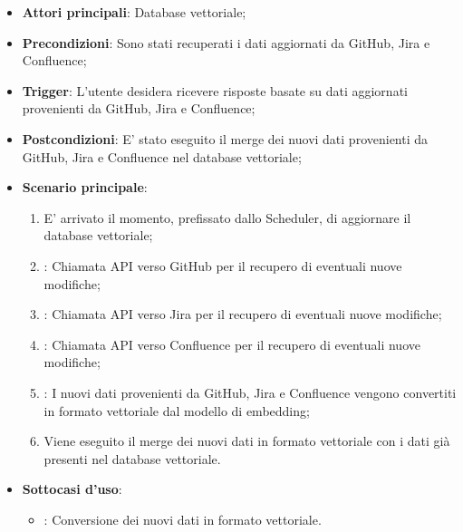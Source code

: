 \hypertarget{UC11.4}{}
\begin{itemize}
    \item \textbf{Attori principali}: Database vettoriale;
    \item \textbf{Precondizioni}: Sono stati recuperati i dati aggiornati da GitHub, Jira e Confluence;
    \item \textbf{Trigger}: L'utente desidera ricevere risposte basate su dati aggiornati provenienti da GitHub, Jira e Confluence;
    \item \textbf{Postcondizioni}: E' stato eseguito il merge dei nuovi dati provenienti da GitHub, Jira e Confluence nel database vettoriale;
    \item \textbf{Scenario principale}:
    \begin{enumerate}
        \item E' arrivato il momento, prefissato dallo Scheduler, di aggiornare il database vettoriale;
        \item {}: Chiamata API verso GitHub per il recupero di eventuali nuove modifiche;
        \item {}: Chiamata API verso Jira per il recupero di eventuali nuove modifiche;
        \item {}: Chiamata API verso Confluence per il recupero di eventuali nuove modifiche;
        \item {}: I nuovi dati provenienti da GitHub, Jira e Confluence vengono convertiti in formato vettoriale dal modello di embedding;
        \item Viene eseguito il merge dei nuovi dati in formato vettoriale con i dati già presenti nel database vettoriale.
    \end{enumerate}
    \item \textbf{Sottocasi d'uso}:
    \begin{itemize}
        \item {}: Conversione dei nuovi dati in formato vettoriale.
    \end{itemize}
\end{itemize}

\hypertarget{UC11.4.1}{}
